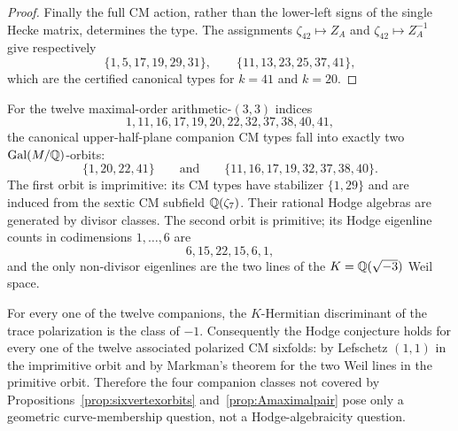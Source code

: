 \begin{proof}
Finally the full CM action, rather than the lower-left signs of the single
Hecke matrix, determines the type.  The assignments
$\zeta_{42}\mapsto Z_A$ and $\zeta_{42}\mapsto Z_A^{-1}$ give respectively
\[
 \{1,5,17,19,29,31\},\qquad
 \{11,13,23,25,37,41\},
\]
which are the certified canonical types for $k=41$ and $k=20$.
\end{proof}


\begin{theorem}\label{thm:packetHodge}
For the twelve maximal-order arithmetic-$(3,3)$ indices
\[
  1,11,16,17,19,20,22,32,37,38,40,41,
\]
the canonical upper-half-plane companion CM types fall into exactly two
$\operatorname{Gal}(M/\mathbb Q)$-orbits:
\[
 \{1,20,22,41\}
 \qquad\text{and}\qquad
 \{11,16,17,19,32,37,38,40\}.
\]
The first orbit is imprimitive: its CM types have stabilizer $\{1,29\}$ and
are induced from the sextic CM subfield $\mathbb Q(\zeta_7)$.  Their rational Hodge
algebras are generated by divisor classes.  The second orbit is primitive;
its Hodge eigenline counts in codimensions $1,\ldots,6$ are
\[
 6,15,22,15,6,1,
\]
and the only non-divisor eigenlines are the two lines of the
$K=\mathbb Q(\sqrt{-3})$ Weil space.

For every one of the twelve companions, the $K$-Hermitian discriminant of the
trace polarization is the class of $-1$.  Consequently the Hodge conjecture
holds for every one of the twelve associated polarized CM sixfolds: by
Lefschetz $(1,1)$ in the imprimitive orbit and by Markman's theorem for the
two Weil lines in the primitive orbit.  Therefore the four companion classes
not covered by Propositions~\ref{prop:sixvertexorbits}
and~\ref{prop:Amaximalpair} pose only a geometric curve-membership question,
not a Hodge-algebraicity question.
\end{theorem}
